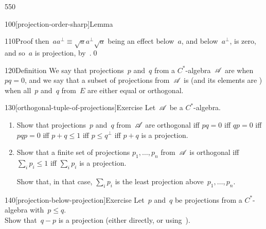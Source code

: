 \begin{parsec}{550}
\begin{point}{100}[projection-order-sharp]{Lemma}
\begin{point}{110}{Proof}
then~$aa^\perp\equiv \sqrt{a}a^\perp \sqrt{a}$
being an effect below~$a$, and below~$a^\perp$,
is zero, and so~$a$ is projection, by~.\qed
\end{point}
\end{point}
\begin{point}{120}{Definition}%
We say that projections~$p$ and~$q$
from a $C^*$-algebra~$\mathscr{A}$ are %
when~$pq=0$,
and we say that a subset of projections
from~$\mathscr{A}$ is 
(and its elements are )
when all~$p$ and~$q$ from~$E$
are either equal or orthogonal.
\end{point}
\begin{point}{130}[orthogonal-tuple-of-projections]{Exercise}%
Let~$\mathscr{A}$ be a $C^*$-algebra.
\begin{enumerate}
\item
Show that projections~$p$ and~$q$ from~$\mathscr{A}$
are orthogonal iff $pq=0$ iff $qp=0$ iff $pqp=0$
iff $p+q\leq 1$ iff $p\leq q^\perp$
iff $p+q$ is a projection.
\item
Show that a finite set of  projections $p_1,\dotsc,p_n$
from~$\mathscr{A}$ is orthogonal
iff~$\sum_i p_i \leq 1$
iff $\sum_i p_i$ is a projection.

Show that, in that case, $\sum_i p_i$ is the least projection
above~$p_1,\dotsc,p_n$.
\end{enumerate}
\end{point}
\begin{point}{140}[projection-below-projection]{Exercise}%
Let~$p$ and~$q$ be projections from a $C^*$-algebra
with~$p\leq q$.\\
Show that~$q-p$ is a projection
(either directly, or using~).
\end{point}
\end{parsec}
